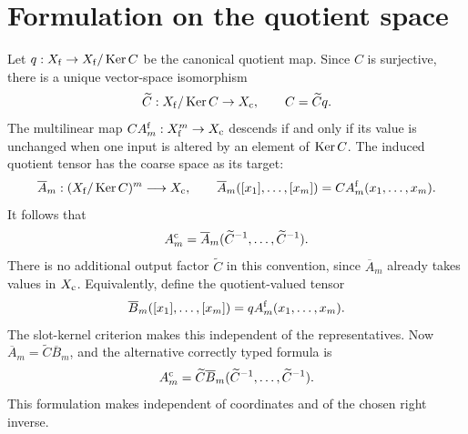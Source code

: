 \documentclass[11pt,oneside,openany]{book}
\numberwithin{equation}{section}
\begin{document}
\section{Formulation on the quotient space}\label{PRIQ:app:quotient}
Let $q:X_{\mathrm f}\to X_{\mathrm f}/\operatorname{Ker} C$ be the canonical quotient map. Since $C$ is surjective, there is a unique vector-space isomorphism
\[
\widetilde C:X_{\mathrm f}/\operatorname{Ker} C\to X_{\mathrm c},\qquad C=\widetilde Cq.
\]
The multilinear map $CA_m^{\mathrm f}:X_{\mathrm f}^m\to X_{\mathrm c}$ descends if and only if its value is unchanged when one input is altered by an element of $\operatorname{Ker} C$. The induced quotient tensor has the coarse space as its target:
\[
\overline A_m:(X_{\mathrm f}/\operatorname{Ker} C)^m\longrightarrow X_{\mathrm c},\qquad
\overline A_m([x_1],\ldots,[x_m])=CA_m^{\mathrm f}(x_1,\ldots,x_m).
\]
It follows that
\[
A_m^{\mathrm c}=\overline A_m(\widetilde C^{-1},\ldots,\widetilde C^{-1}).
\]
There is no additional output factor $\widetilde C$ in this convention, since $\overline A_m$ already takes values in $X_{\mathrm c}$.
Equivalently, define the quotient-valued tensor
\[
\overline B_m([x_1],\ldots,[x_m])=qA_m^{\mathrm f}(x_1,\ldots,x_m).
\]
The slot-kernel criterion makes this independent of the representatives. Now $\overline A_m=\widetilde C\overline B_m$, and the alternative correctly typed formula is
\[
A_m^{\mathrm c}=\widetilde C\overline B_m(\widetilde C^{-1},\ldots,\widetilde C^{-1}).
\]
This formulation makes  independent of coordinates and of the chosen right inverse.
\end{document}
